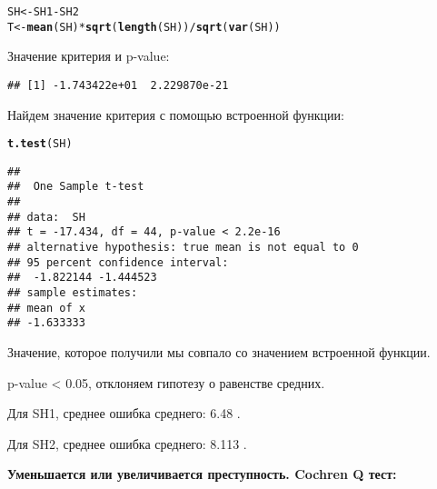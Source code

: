 \documentclass{article}\usepackage[]{graphicx}\usepackage[]{color}
\makeatletter
\newcommand{\hlopt}[1]{\textcolor[rgb]{0,0,0}{#1}}%
\newcommand{\hlstd}[1]{\textcolor[rgb]{0.345,0.345,0.345}{#1}}%
\newcommand{\hlkwb}[1]{\textcolor[rgb]{0.69,0.353,0.396}{#1}}%
\newcommand{\hlkwd}[1]{\textcolor[rgb]{0.737,0.353,0.396}{\textbf{#1}}}%
\newenvironment{kframe}{%
 \def\at@end@of@kframe{}%
 \ifinner\ifhmode%
  \def\at@end@of@kframe{\end{minipage}}%
  \begin{minipage}{\columnwidth}%
 \fi\fi%
 \def\FrameCommand##1{\hskip\@totalleftmargin \hskip-\fboxsep
 \colorbox{shadecolor}{##1}\hskip-\fboxsep
     \hskip-\linewidth \hskip-\@totalleftmargin \hskip\columnwidth}%
 \MakeFramed {\advance\hsize-\width
   \@totalleftmargin\z@ \linewidth\hsize
   \@setminipage}}%
 {\par\unskip\endMakeFramed%
 \at@end@of@kframe}
\newenvironment{knitrout}{}{} %
\makeatother
\begin{document}
\begin{knitrout}
\begin{kframe}
\begin{alltt}
\hlstd{SH} \hlkwb{<-} \hlstd{SH1} \hlopt{-} \hlstd{SH2}
\hlstd{T} \hlkwb{<-} \hlkwd{mean}\hlstd{(SH)} \hlopt{*} \hlkwd{sqrt}\hlstd{(}\hlkwd{length}\hlstd{(SH))} \hlopt{/} \hlkwd{sqrt}\hlstd{(}\hlkwd{var}\hlstd{(SH))}
\end{alltt}
\end{kframe}
\end{knitrout}
Значение критерия и p-value:
\begin{knitrout}
\color{fgcolor}\begin{kframe}
\begin{verbatim}
## [1] -1.743422e+01  2.229870e-21
\end{verbatim}
\end{kframe}
\end{knitrout}
Найдем значение критерия с помощью встроенной функции:
\begin{knitrout}
\color{fgcolor}\begin{kframe}
\begin{alltt}
\hlkwd{t.test}\hlstd{(SH)}
\end{alltt}
\begin{verbatim}
## 
## 	One Sample t-test
## 
## data:  SH
## t = -17.434, df = 44, p-value < 2.2e-16
## alternative hypothesis: true mean is not equal to 0
## 95 percent confidence interval:
##  -1.822144 -1.444523
## sample estimates:
## mean of x 
## -1.633333
\end{verbatim}
\end{kframe}
\end{knitrout}
Значение, которое получили мы совпало со значением встроенной функции.

p-value < 0.05, отклоняем гипотезу о равенстве средних.

Для SH1, среднее \textpm ошибка среднего: 6.48 .

Для SH2, среднее \textpm ошибка среднего: 8.113 .

\newpage

\textbf{Уменьшается или увеличивается преступность. Cochren Q тест:}
\end{document}
